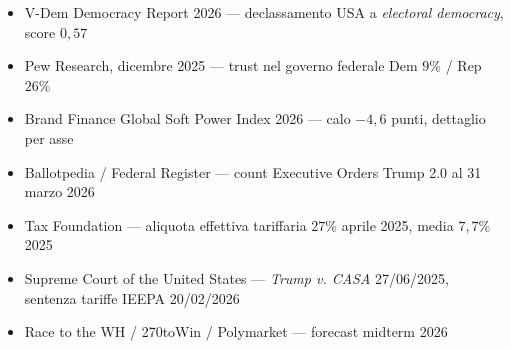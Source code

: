 \begin{itemize}
\tightlist
\item
  V-Dem Democracy Report 2026 --- declassamento USA a \emph{electoral
  democracy}, score \(0{,}57\)
\item
  Pew Research, dicembre 2025 --- trust nel governo federale Dem \(9\%\)
  / Rep \(26\%\)
\item
  Brand Finance Global Soft Power Index 2026 --- calo \(-4{,}6\) punti,
  dettaglio per asse
\item
  Ballotpedia / Federal Register --- count Executive Orders Trump 2.0 al
  31 marzo 2026
\item
  Tax Foundation --- aliquota effettiva tariffaria \(27\%\) aprile 2025,
  media \(7{,}7\%\) 2025
\item
  Supreme Court of the United States --- \emph{Trump v. CASA}
  27/06/2025, sentenza tariffe IEEPA 20/02/2026
\item
  Race to the WH / 270toWin / Polymarket --- forecast midterm 2026
\end{itemize}


